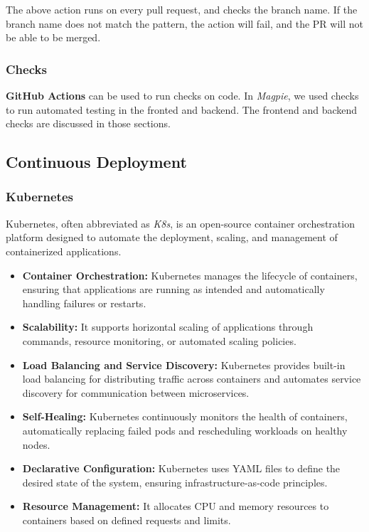 \documentclass[preview]{standalone}
\begin{document}
The above action runs on every pull request, and checks the branch name. If the
branch name does not match the pattern, the action will fail, and the PR will
not be able to be merged.

\subsubsection{Checks}

\textbf{GitHub Actions} can be used to run checks on code. In \textit{Magpie},
we used checks to run automated testing in the fronted and backend. The frontend
and backend checks are discussed in those sections.

\subsection{Continuous Deployment}

\subsubsection{Kubernetes}
Kubernetes, often abbreviated as \textit{K8s}, is an open-source container
orchestration platform designed to automate the deployment, scaling, and
management of containerized applications.

\begin{itemize}
    \item \textbf{Container Orchestration:} Kubernetes manages the lifecycle of
    containers, ensuring that applications are running as intended and
    automatically handling failures or restarts.
    \item \textbf{Scalability:} It supports horizontal scaling of applications
    through commands, resource monitoring, or automated scaling policies.
    \item \textbf{Load Balancing and Service Discovery:} Kubernetes provides
    built-in load balancing for distributing traffic across containers and
    automates service discovery for communication between microservices.
    \item \textbf{Self-Healing:} Kubernetes continuously monitors the health of
    containers, automatically replacing failed pods and rescheduling workloads
    on healthy nodes.
    \item \textbf{Declarative Configuration:} Kubernetes uses YAML files
    to define the desired state of the system, ensuring infrastructure-as-code
    principles.
    \item \textbf{Resource Management:} It allocates CPU and memory resources to
    containers based on defined requests and limits.
\end{itemize}
\end{document}
